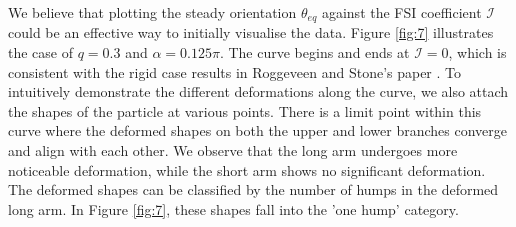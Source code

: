 \documentclass[12pt,MSc,twoside]{muthesis_2020}
\begin{document}
We believe that plotting the steady orientation $\theta_{eq}$ against the FSI coefficient $\mathcal{I}$ could be an effective way to initially visualise the data. Figure \ref{fig:7} illustrates the case of $q = 0.3$ and $\alpha = 0.125\pi$. The curve begins and ends at $\mathcal{I}=0$, which is consistent with the rigid case results in Roggeveen and Stone's paper \cite{roggeveen2022motion}. To intuitively demonstrate the different deformations along the curve, we also attach the shapes of the particle at various points. There is a limit point within this curve where the deformed shapes on both the upper and lower branches converge and align with each other. We observe that the long arm undergoes more noticeable deformation, while the short arm shows no significant deformation. The deformed shapes can be classified by the number of humps in the deformed long arm. In Figure \ref{fig:7}, these shapes fall into the 'one hump' category.
\end{document}
